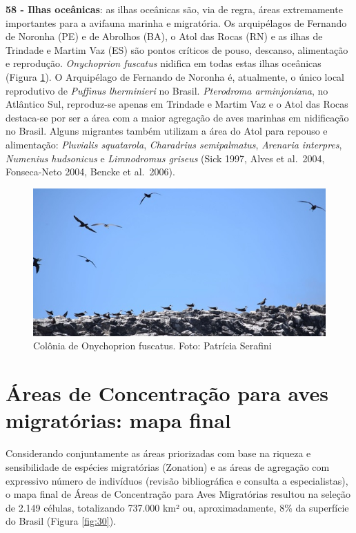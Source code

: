 \documentclass[
  oneside]{scrbook}
\begin{document}
\textbf{58 - Ilhas oceânicas}: as ilhas oceânicas são, via de regra, áreas extremamente importantes para a avifauna marinha e migratória. Os arquipélagos de Fernando de Noronha (PE) e de Abrolhos (BA), o Atol das Rocas (RN) e as ilhas de Trindade e Martim Vaz (ES) são pontos críticos de pouso, descanso, alimentação e reprodução. \emph{Onychoprion fuscatus} nidifica em todas estas ilhas oceânicas (Figura \ref{fig:29}). O Arquipélago de Fernando de Noronha é, atualmente, o único local reprodutivo de \emph{Puffinus lherminieri} no Brasil. \emph{Pterodroma arminjoniana}, no Atlântico Sul, reproduz-se apenas em Trindade e Martim Vaz e o Atol das Rocas destaca-se por ser a área com a maior agregação de aves marinhas em nidificação no Brasil. Alguns migrantes também utilizam a área do Atol para repouso e alimentação: \emph{Pluvialis squatarola}, \emph{Charadrius semipalmatus}, \emph{Arenaria interpres}, \emph{Numenius hudsonicus} e \emph{Limnodromus griseus} (Sick 1997, Alves et al.~2004, Fonseca-Neto 2004, Bencke et al.~2006).

\begin{figure}[H]

{\centering \includegraphics[width=0.75\linewidth]{imagens/cap07/Figura_7.9} 

}

\caption{Colônia de Onychoprion fuscatus. Foto: Patrícia Serafini}\label{fig:29}
\end{figure}

\hypertarget{uxe1reas-de-concentrauxe7uxe3o-para-aves-migratuxf3rias-mapa-final}{%
\section{Áreas de Concentração para aves migratórias: mapa final}\label{uxe1reas-de-concentrauxe7uxe3o-para-aves-migratuxf3rias-mapa-final}}

Considerando conjuntamente as áreas priorizadas com base na riqueza e sensibilidade de espécies migratórias (Zonation) e as áreas de agregação com expressivo número de indivíduos (revisão bibliográfica e consulta a especialistas), o mapa final de Áreas de Concentração para Aves Migratórias resultou na seleção de 2.149 células, totalizando 737.000 km² ou, aproximadamente, 8\% da superfície do Brasil (Figura \ref{fig:30}).
\end{document}
